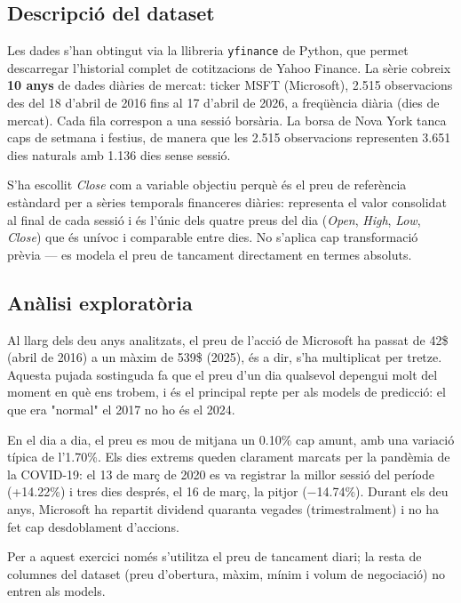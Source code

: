 \documentclass[12pt,a4paper]{article}
\begin{document}
\subsection{Descripció del dataset}

Les dades s'han obtingut via la llibreria \texttt{yfinance} de Python, que permet descarregar
l'historial complet de cotitzacions de Yahoo Finance. La sèrie cobreix \textbf{10 anys}
de dades diàries de mercat: ticker MSFT (Microsoft), 2.515 observacions des del 18 d'abril
de 2016 fins al 17 d'abril de 2026, a freqüència diària (dies de mercat).
Cada fila correspon a una sessió borsària. La borsa de Nova York tanca caps de setmana
i festius, de manera que les 2.515 observacions representen 3.651 dies naturals amb
1.136 dies sense sessió.

S'ha escollit \textit{Close} com a variable objectiu perquè és el preu de referència
estàndard per a sèries temporals financeres diàries: representa el valor consolidat
al final de cada sessió i és l'únic dels quatre preus del dia (\textit{Open},
\textit{High}, \textit{Low}, \textit{Close}) que és unívoc i comparable entre dies.
No s'aplica cap transformació prèvia --- es modela el preu de tancament directament
en termes absoluts.

\subsection{Anàlisi exploratòria}

Al llarg dels deu anys analitzats, el preu de l'acció de Microsoft ha passat de 42\$
(abril de 2016) a un màxim de 539\$ (2025), és a dir, s'ha multiplicat per tretze. Aquesta
pujada sostinguda fa que el preu d'un dia qualsevol depengui molt del moment en què ens trobem,
i és el principal repte per als models de predicció: el que era "normal" el 2017 no ho és
el 2024.

En el dia a dia, el preu es mou de mitjana un 0.10\% cap amunt, amb una variació típica
de l'1.70\%. Els dies extrems queden clarament marcats per la pandèmia de la COVID-19:
el 13 de març de 2020 es va registrar la millor sessió del període (+14.22\%) i tres dies
després, el 16 de març, la pitjor ($-$14.74\%). Durant els deu anys, Microsoft ha repartit
dividend quaranta vegades (trimestralment) i no ha fet cap desdoblament d'accions.

Per a aquest exercici només s'utilitza el preu de tancament diari; la resta de columnes
del dataset (preu d'obertura, màxim, mínim i volum de negociació) no entren als models.
\end{document}
